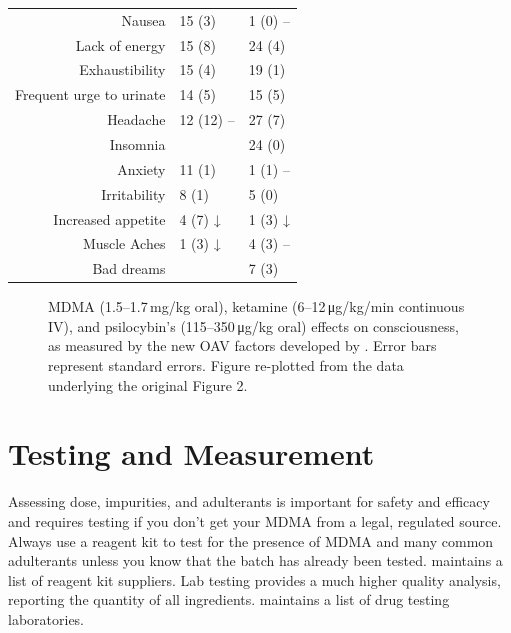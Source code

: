\documentclass[11pt,oneside]{book}
\begin{document}
\begin{table}[htbp]
\begin{tabular}{|r|l|l|}
        Nausea                   & 15 (3)  & 1\phantom{0} (0)\phantom{0} --\\
        Lack of energy           & 15 (8)  & 24 (4)\\
        Exhaustibility           & 15 (4)  & 19 (1)\\
        Frequent urge to urinate & 14 (5)  & 15 (5)\\
        Headache                 & 12 (12) -- & 27 (7)\\
        Insomnia                 &                            & 24 (0)\\
        Anxiety                  & 11 (1) & 1\phantom{0} (1)\phantom{0} --\\
        Irritability             & 8\phantom{0} (1)  & 5\phantom{0} (0)\\
        Increased appetite       & 4\phantom{0} (7)\phantom{0} ↓ & 1\phantom{0} (3)\phantom{0} ↓\\
        Muscle Aches             & 1\phantom{0} (3)\phantom{0} ↓ & 4\phantom{0} (3)\phantom{0} --\\
        Bad dreams               &                                    & 7\phantom{0} (3)\\
    \hline
    \end{tabular}
\end{table}
\begin{figure}[htbp]
  \centering
  \resizebox{\textwidth}{!}{}
  \caption{MDMA (1.5--1.7\,mg/kg oral), ketamine (6--12\,μg/kg/min continuous IV), and psilocybin's (115--350\,μg/kg oral) effects on consciousness, as measured by the new OAV factors developed by \textcite{studerus2010psychometric}. Error bars represent standard errors. Figure re-plotted from the data underlying the original Figure 2.}
  \label{consciousEffects}
\end{figure}
\FloatBarrier

\section{Testing and Measurement}
\label{testing}
Assessing dose, impurities, and adulterants is important for safety and efficacy and requires testing if you don't get your MDMA from a legal, regulated source. Always use a reagent kit to test for the presence of MDMA and many common adulterants unless you know that the batch has already been tested. \textcite{testKitSuppliers} maintains a list of reagent kit suppliers. Lab testing provides a much higher quality analysis, reporting the quantity of all ingredients. \textcite{testingLabs} maintains a list of drug testing laboratories.
\end{document}
